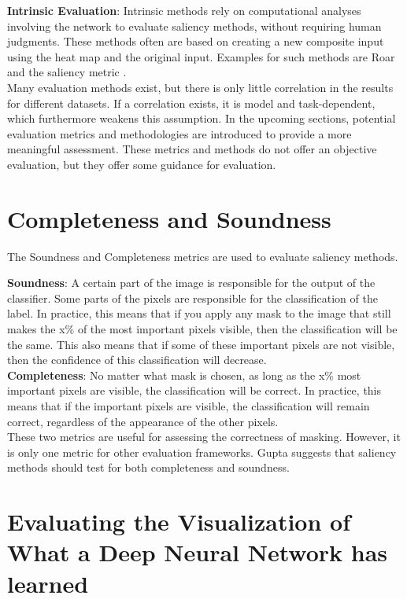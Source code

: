 \textbf{Intrinsic Evaluation}: 
Intrinsic methods rely on computational analyses involving the network to evaluate saliency methods, without requiring human judgments. 
These methods often are based on creating a new composite input using the heat map and the original input. Examples for such methods are Roar \cite{hooker2019benchmark} and the saliency metric \cite{dabkowski2017real}.
\\

Many evaluation methods exist, but there is only little correlation\cite{neely2021order} in the results for different datasets. If a correlation exists, it is model and task-dependent, which furthermore weakens this assumption.
In the upcoming sections, potential evaluation metrics and methodologies are introduced to provide a more meaningful assessment. These metrics and methods do not offer an objective evaluation, but they offer some guidance for evaluation. 

\section{Completeness and Soundness}

The Soundness and Completeness metrics \cite{gupta2022new} are used to evaluate saliency methods.

\textbf{Soundness}: A certain part of the image is responsible for the output of the classifier. Some parts of the pixels are responsible for the classification of the label. In practice, this means that if you apply any mask to the image that still makes the x\% of the most important pixels visible, then the classification will be the same. This also means that if some of these important pixels are not visible, then the confidence of this classification will decrease. \\
\textbf{Completeness}: No matter what mask is chosen, as long as the x\% most important pixels are visible, the classification will be correct. In practice, this means that if the important pixels are visible, the classification will remain correct, regardless of the appearance of the other pixels.\\

These two metrics are useful for assessing the correctness of masking. However, it is only one metric for other evaluation frameworks. Gupta suggests that saliency methods should test for both completeness and soundness.

\section{Evaluating the Visualization of What a Deep Neural Network has learned}
\label{pertubation}

